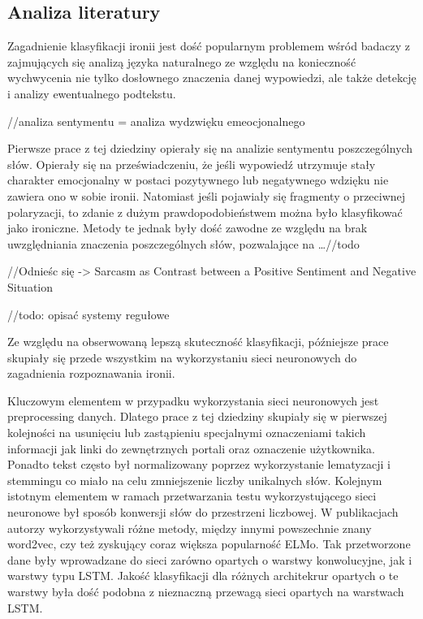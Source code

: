 \subsection{Analiza literatury}



Zagadnienie klasyfikacji ironii jest dość popularnym problemem wśród badaczy z zajmujących się analizą języka naturalnego ze względu na konieczność wychwycenia nie tylko dosłownego znaczenia danej wypowiedzi, ale także detekcję i analizy ewentualnego podtekstu.  

//analiza sentymentu = analiza wydzwięku emeocjonalnego 

Pierwsze prace z tej dziedziny opierały się na analizie sentymentu poszczególnych słów. Opierały się na przeświadczeniu, że jeśli wypowiedź utrzymuje stały charakter emocjonalny w postaci pozytywnego lub negatywnego wdzięku nie zawiera ono w sobie ironii. Natomiast jeśli pojawiały się fragmenty o przeciwnej polaryzacji, to zdanie z dużym prawdopodobieństwem można było klasyfikować jako ironiczne. Metody te jednak były dość zawodne ze względu na brak uwzględniania znaczenia poszczególnych słów, pozwalające na …//todo 

//Odnieśc się ->  Sarcasm as Contrast between a Positive Sentiment and Negative Situation 

//todo: opisać systemy regułowe 

 

Ze względu na obserwowaną lepszą skuteczność klasyfikacji, późniejsze prace skupiały się przede wszystkim na wykorzystaniu sieci neuronowych do zagadnienia rozpoznawania ironii.  

Kluczowym elementem w przypadku wykorzystania sieci neuronowych jest preprocessing danych. Dlatego prace z tej dziedziny skupiały się w pierwszej kolejności na usunięciu lub zastąpieniu specjalnymi oznaczeniami takich informacji jak linki do zewnętrznych portali oraz oznaczenie użytkownika. Ponadto tekst często był normalizowany poprzez wykorzystanie lematyzacji i stemmingu co miało na celu zmniejszenie liczby unikalnych słów. Kolejnym istotnym elementem w ramach przetwarzania testu wykorzystującego sieci neuronowe był sposób konwersji słów do przestrzeni liczbowej. W publikacjach autorzy wykorzystywali różne metody, między innymi powszechnie znany word2vec, czy też zyskujący coraz większa popularność ELMo. Tak przetworzone dane były wprowadzane do sieci zarówno opartych o warstwy konwolucyjne, jak i warstwy typu LSTM. Jakość klasyfikacji dla różnych architekrur opartych o te warstwy była dość podobna z nieznaczną przewagą sieci opartych na warstwach LSTM. 

 

